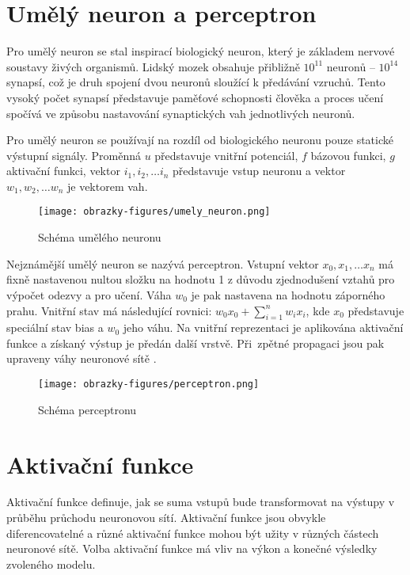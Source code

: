 \section{Umělý neuron a perceptron}
Pro umělý neuron se stal inspirací biologický neuron, který je základem nervové soustavy živých organismů. Lidský mozek obsahuje přibližně $10^{11}$ neuronů -- $10^{14}$ synapsí, což je druh spojení dvou neuronů sloužící k předávání vzruchů. Tento vysoký počet synapsí představuje paměťové schopnosti člověka a proces učení spočívá ve způsobu nastavování synaptických vah jednotlivých neuronů. 

Pro umělý neuron se používají na rozdíl od biologického neuronu pouze statické výstupní signály. Proměnná $u$ představuje vnitřní potenciál, $f$ bázovou funkci, $g$ aktivační funkci, vektor $i_1, i_2,\ldots i_n$ představuje vstup neuronu a vektor $w_1, w_2,\ldots w_n$ je vektorem vah. 

\begin{figure}[!htbp]
    \centering
    \texttt{[image: obrazky-figures/umely\_neuron.png]}
    \caption{Schéma umělého neuronu \cite{IZULecture}}
\end{figure}


Nejznámější umělý neuron se nazývá perceptron. Vstupní vektor $x_0, x_1,\ldots x_n$ má fixně nastavenou nultou složku na hodnotu 1 z důvodu zjednodušení vztahů pro výpočet odezvy a pro učení. Váha $w_0$ je pak nastavena na hodnotu záporného prahu. Vnitřní stav má následující rovnici: $w_0x_0 + \sum_{i=1}^{n}w_ix_i$, kde $x_0$ představuje speciální stav bias a $w_0$ jeho váhu. Na vnitřní reprezentaci je aplikována aktivační funkce a získaný výstup je předán další vrstvě. Při~zpětné propagaci jsou pak upraveny váhy neuronové sítě \cite{IZULecture}.

\begin{figure}[!htbp]
    \centering
    \texttt{[image: obrazky-figures/perceptron.png]}
    \caption{Schéma perceptronu \cite{IZULecture}}
\end{figure}


\section{Aktivační funkce}
Aktivační funkce definuje, jak se suma vstupů bude transformovat na výstupy v průběhu průchodu neuronovou sítí. Aktivační funkce jsou obvykle diferencovatelné a různé aktivační funkce mohou být užity v různých částech neuronové sítě. Volba aktivační funkce má vliv na výkon a konečné výsledky zvoleného modelu. 

